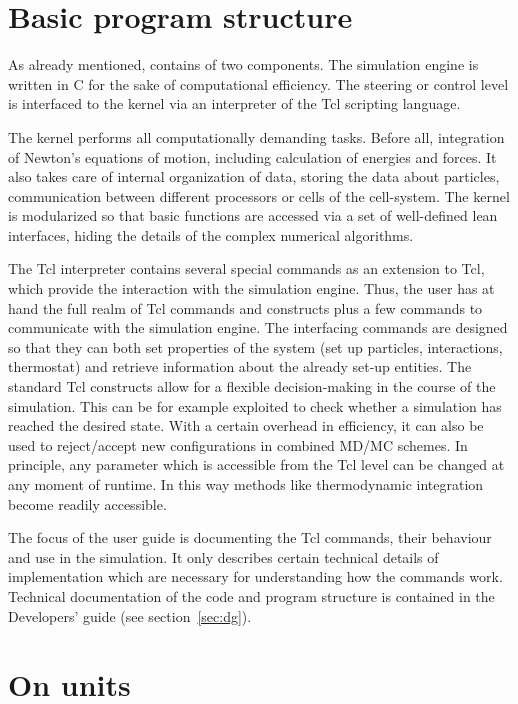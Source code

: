 \section{Basic program structure}
\label{sec:structure}

As already mentioned, \es contains of two components.
The simulation engine is written in C for the sake
of computational efficiency. The steering or control
level is interfaced to the kernel via an interpreter 
of the Tcl scripting language.

The kernel performs all computationally demanding tasks. Before all,
integration of Newton's equations of motion, including calculation of
energies and forces. It also takes care of internal organization of
data, storing the data about particles, communication between
different processors or cells of the cell-system. The kernel is
modularized so that basic functions are accessed via a set of
well-defined lean interfaces, hiding the details of the complex
numerical algorithms.

The Tcl interpreter contains several special commands as an extension
to Tcl, which provide the interaction with the simulation
engine. Thus, the user has at hand the full realm of Tcl commands and
constructs plus a few commands to communicate with the simulation
engine. The interfacing commands are designed so that they can both
set properties of the system (set up particles, interactions,
thermostat) and retrieve information about the already set-up
entities. The standard Tcl constructs allow for a flexible
decision-making in the course of the simulation. This can be for
example exploited to check whether a simulation has reached the
desired state.  With a certain overhead in efficiency, it can also be
used to reject/accept new configurations in combined MD/MC schemes. In
principle, any parameter which is accessible from the Tcl level can be
changed at any moment of runtime.  In this way methods like
thermodynamic integration become readily accessible.

The focus of the user guide is documenting the Tcl commands, their
behaviour and use in the simulation. It only describes certain
technical details of implementation which are necessary for
understanding how the commands work.  Technical documentation of the
code and program structure is contained in the Developers' guide (see
section~\ref{sec:dg}).

\section{On units}
\label{sec:units}

